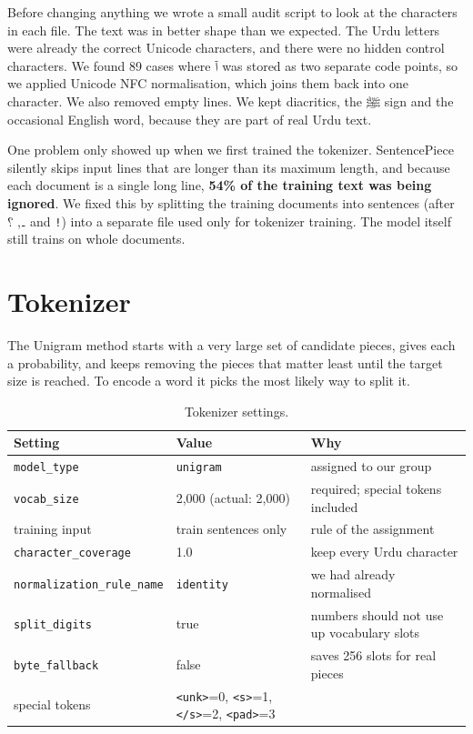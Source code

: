 \documentclass[11pt,a4paper]{article}
\newcommand{\ur}[1]{\texturdu{#1}}
\begin{document}
Before changing anything we wrote a small audit script to look at the characters in each file. The text was in better shape than we expected. The Urdu letters were already the correct Unicode characters, and there were no hidden control characters. We found 89 cases where \ur{آ} was stored as two separate code points, so we applied Unicode NFC normalisation, which joins them back into one character. We also removed empty lines. We kept diacritics, the \ur{ﷺ} sign and the occasional English word, because they are part of real Urdu text.

One problem only showed up when we first trained the tokenizer. SentencePiece silently skips input lines that are longer than its maximum length, and because each document is a single long line, \textbf{54\% of the training text was being ignored}. We fixed this by splitting the training documents into sentences (after \ur{۔}, \ur{؟} and \texttt{!}) into a separate file used only for tokenizer training. The model itself still trains on whole documents.

\section{Tokenizer}

The Unigram method starts with a very large set of candidate pieces, gives each a probability, and keeps removing the pieces that matter least until the target size is reached. To encode a word it picks the most likely way to split it.

\begin{table}[H]
\centering
\small
\begin{tabular}{l l >{\raggedright\arraybackslash}p{}}
\toprule
Setting & Value & Why \\
\midrule
\texttt{model\_type} & \texttt{unigram} & assigned to our group \\
\texttt{vocab\_size} & 2{,}000 (actual: 2{,}000) & required; special tokens included \\
training input & train sentences only & rule of the assignment \\
\texttt{character\_coverage} & 1.0 & keep every Urdu character \\
\texttt{normalization\_rule\_name} & \texttt{identity} & we had already normalised \\
\texttt{split\_digits} & true & numbers should not use up vocabulary slots \\
\texttt{byte\_fallback} & false & saves 256 slots for real pieces \\
special tokens & \texttt{<unk>}=0, \texttt{<s>}=1, \texttt{</s>}=2, \texttt{<pad>}=3 & \\
\bottomrule
\end{tabular}
\caption{Tokenizer settings.}
\end{table}
\end{document}
